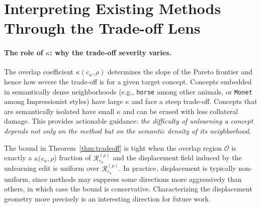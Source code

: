 \section{Interpreting Existing Methods Through the Trade-off Lens}
\label{app:method_analysis}
\paragraph{The role of $\kappa$: why the trade-off severity varies.}
The overlap coefficient $\kappa(c_u,\rho)$ determines the slope of the Pareto frontier and hence how severe the trade-off is for a given target concept. Concepts embedded in semantically dense neighborhoods (e.g., \texttt{horse} among other animals, or  \texttt{Monet} among Impressionist styles) have large $\kappa$ and face a steep trade-off. Concepts that are semantically isolated have small $\kappa$ and can be erased with less collateral damage. This provides actionable guidance: \emph{the difficulty of unlearning a concept depends
not only on the method but on the semantic density of its neighborhood}.

\begin{remark}
\label{rem:tightness}
The bound in Theorem~\ref{thm:tradeoff} is tight when the overlap region $\mathcal{O}$ is exactly a $\kappa(c_u,\rho$) fraction of $\mathcal{R}_{c_u}^{(\rho)}$ and the displacement field induced by the unlearning edit is uniform over $\mathcal{R}_{c_u}^{(\rho)}$. In practice, displacement is typically non-uniform, since methods may suppress some directions more aggressively than others, in which case the bound is conservative. Characterizing the displacement geometry more precisely is an interesting direction for future work.
\end{remark}

